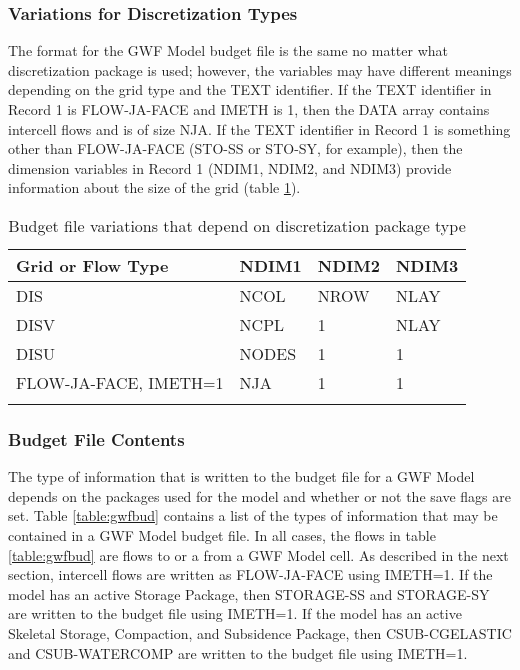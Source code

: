 \subsubsection{Variations for Discretization Types}
The format for the GWF Model budget file is the same no matter what discretization package is used; however, the variables may have different meanings depending on the grid type and the TEXT identifier.  If the TEXT identifier in Record 1 is FLOW-JA-FACE and IMETH is 1, then the DATA array contains intercell flows and is of size NJA.  If the TEXT identifier in Record 1 is something other than FLOW-JA-FACE (STO-SS or STO-SY, for example), then the dimension variables in Record 1 (NDIM1, NDIM2, and NDIM3) provide information about the size of the grid (table \ref{table:ndim}).  

\begin{longtable}{p{3cm} p{3cm} p{3cm} p{3cm}}
\caption{Budget file variations that depend on discretization package type} 
\tabularnewline
\hline
\textbf{Grid or Flow Type} & \textbf{NDIM1} & \textbf{NDIM2} & \textbf{NDIM3} \\
\hline
\endhead
\hline
\endfoot
DIS & NCOL & NROW & NLAY \\
DISV & NCPL & 1 & NLAY \\
DISU & NODES & 1 & 1 \\
FLOW-JA-FACE, IMETH=1 & NJA & 1 & 1 \\
\label{table:ndim}
\end{longtable}

\subsubsection{Budget File Contents}

The type of information that is written to the budget file for a GWF Model depends on the packages used for the model and whether or not the save flags are set.  Table \ref{table:gwfbud} contains a list of the types of information that may be contained in a GWF Model budget file.  In all cases, the flows in table \ref{table:gwfbud} are flows to or a from a GWF Model cell.  As described in the next section, intercell flows are written as FLOW-JA-FACE using IMETH=1.  If the model has an active Storage Package, then STORAGE-SS and STORAGE-SY are written to the budget file using IMETH=1. If the model has an active Skeletal Storage, Compaction, and Subsidence Package, then CSUB-CGELASTIC and CSUB-WATERCOMP are written to the budget file using IMETH=1.

